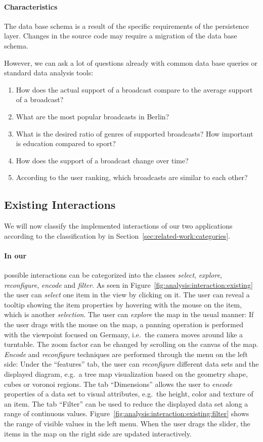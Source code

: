 \paragraph{Characteristics}
The data base schema is a result of the specific requirements of the persistence layer.
Changes in the source code may require a migration of the data base schema.

However, we can ask a lot of questions already with common data base queries or standard data analysis tools:
\begin{enumerate}
  \item
    How does the actual support of a broadcast compare to the average support of a broadcast?
  \item
    What are the most popular broadcasts in Berlin?
  \item
    What is the desired ratio of genres of supported broadcasts? How important is education compared to sport?
  \item
    How does the support of a broadcast change over time?
  \item
    According to the user ranking, which broadcasts are similar to each other?
\end{enumerate}


\subsection{Existing Interactions}
We will now classify the implemented interactions of our two applications according to the classification by \textcite{Yi2007} in Section~\ref{sec:related-work:categories}.

\paragraph{In our \visan{}} possible interactions can be categorized into the classes \emph{select}, \emph{explore}, \emph{reconfigure}, \emph{encode} and \emph{filter}.
As seen in Figure~\ref{fig:analysis:interaction:existing} the user can \emph{select} one item in the view by clicking on it.
The user can reveal a tooltip showing the item properties by hovering with the mouse on the item, which is another \emph{selection}.
The user can \emph{explore} the map in the usual manner:
If the user drags with the mouse on the map, a panning operation is performed with the viewpoint focused on Germany, i.e.\ the camera moves around like a turntable.
The zoom factor can be changed by scrolling on the canvas of the map.
\emph{Encode} and \emph{reconfigure} techniques are performed through the menu on the left side:
Under the ``features'' tab, the user can \emph{reconfigure} different data sets and the displayed diagram, e.g.\ a tree map visualization based on the geometry shape, cubes or voronoi regions.
The tab ``Dimensions'' allows the user to \emph{encode} properties of a data set to visual attributes, e.g.\ the height, color and texture of an item.
The tab ``Filter'' can be used to reduce the displayed data set along a range of continuous values.
Figure~\ref{fig:analysis:interaction:existing:filter} shows the range of visible values in the left menu.
When the user drags the slider, the items in the map on the right side are updated interactively.

